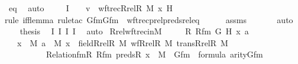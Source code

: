 \begin{isabellebody}
\ eq{}\ \isamarkupfalse%
\ auto\ \isanewline
\isanewline
\ \ \isamarkupfalse%
\ I{}{\isacharcolon}{\kern0pt}\ {\isachardoublequoteopen}{\isachardot}{\kern0pt}{\isachardot}{\kern0pt}{\isachardot}{\kern0pt}\ {\isasymlongleftrightarrow}\ \ v\ {\isacharequal}{\kern0pt}\ wftrec{\isacharparenleft}{\kern0pt}Rrel{\isacharparenleft}{\kern0pt}R{\isacharcomma}{\kern0pt}\ M{\isacharparenright}{\kern0pt}{\isacharcomma}{\kern0pt}\ x{\isacharcomma}{\kern0pt}\ H{\isacharparenright}{\kern0pt}{\isachardoublequoteclose}\ \ \isanewline
\ \ \ \ \isamarkupfalse%
{\isacharparenleft}{\kern0pt}rule\ iff{\isacharunderscore}{\kern0pt}lemma{}{\isacharcomma}{\kern0pt}\ rule{\isacharunderscore}{\kern0pt}tac\ Gfm{\isacharequal}{\kern0pt}Gfm\ \ wftrec{\isacharunderscore}{\kern0pt}prel{\isacharunderscore}{\kern0pt}preds{\isacharunderscore}{\kern0pt}rel{\isacharunderscore}{\kern0pt}eq{\isacharparenright}{\kern0pt}\isanewline
\ \ \ \ \isamarkupfalse%
\ assms\ \isanewline
\ \ \ \ \isamarkupfalse%
\ auto\isanewline
\ \ \isamarkupfalse%
\ {\isacharquery}{\kern0pt}thesis\ \isamarkupfalse%
\ I{}\ I{}\ I{}\ I{}\ \isamarkupfalse%
\ auto\isanewline
{}\isamarkupfalse%
%
\endisatagproof
{\isafoldproof}%
%
\isadelimproof
\isanewline
%
\endisadelimproof
\isanewline
{}\isamarkupfalse%
\ Rrel{\isacharunderscore}{\kern0pt}wftrec{\isacharunderscore}{\kern0pt}in{\isacharunderscore}{\kern0pt}M\ {\isacharcolon}{\kern0pt}\ \isanewline
\ \ \ R\ Rfm\ G\ H\ x\ a\isanewline
\ \ \ {\isachardoublequoteopen}x\ {\isasymin}\ M{\isachardoublequoteclose}\ {\isachardoublequoteopen}a\ {\isasymin}\ M{\isachardoublequoteclose}\ {\isachardoublequoteopen}x\ {\isasymin}\ field{\isacharparenleft}{\kern0pt}Rrel{\isacharparenleft}{\kern0pt}R{\isacharcomma}{\kern0pt}\ M{\isacharparenright}{\kern0pt}{\isacharparenright}{\kern0pt}{\isachardoublequoteclose}\ {\isachardoublequoteopen}wf{\isacharparenleft}{\kern0pt}Rrel{\isacharparenleft}{\kern0pt}R{\isacharcomma}{\kern0pt}\ M{\isacharparenright}{\kern0pt}{\isacharparenright}{\kern0pt}{\isachardoublequoteclose}\ {\isachardoublequoteopen}trans{\isacharparenleft}{\kern0pt}Rrel{\isacharparenleft}{\kern0pt}R{\isacharcomma}{\kern0pt}\ M{\isacharparenright}{\kern0pt}{\isacharparenright}{\kern0pt}{\isachardoublequoteclose}\isanewline
\ \ \ \ \ \ \ \ \ \ {\isachardoublequoteopen}Relation{\isacharunderscore}{\kern0pt}fm{\isacharparenleft}{\kern0pt}R{\isacharcomma}{\kern0pt}\ Rfm{\isacharparenright}{\kern0pt}{\isachardoublequoteclose}\ {\isachardoublequoteopen}preds{\isacharparenleft}{\kern0pt}R{\isacharcomma}{\kern0pt}\ x{\isacharparenright}{\kern0pt}\ {\isasymin}\ M{\isachardoublequoteclose}\ \ {\isachardoublequoteopen}Gfm\ {\isasymin}\ formula{\isachardoublequoteclose}\ {\isachardoublequoteopen}arity{\isacharparenleft}{\kern0pt}Gfm{\isacharparenright}{\kern0pt}\ {\isasymle}\ {}{\isachardoublequoteclose}\ \isanewline

\end{isabellebody}
